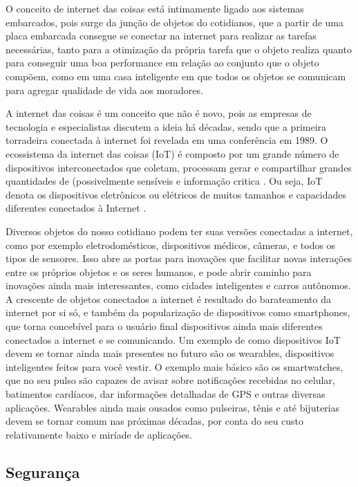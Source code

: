 O conceito de internet das coisas está intimamente ligado aos sistemas embarcados, pois surge da junção de objetos do cotidianos, que a partir de uma placa embarcada consegue se conectar na internet \cite{iotDef} para realizar as tarefas necessárias, tanto para a otimização da própria tarefa que o objeto realiza quanto para conseguir uma boa performance em relação ao conjunto que o objeto compõem, como em uma casa inteligente em que todos os objetos se comunicam para agregar qualidade de vida aos moradores.

A internet das coisas é um conceito que não é novo, pois as empresas de tecnologia e especialistas discutem a ideia há décadas, sendo que a primeira torradeira conectada à internet foi revelada em uma conferência em 1989.
O ecossistema da internet das coisas (IoT) é composto por um
grande número de dispositivos interconectados que coletam, processam
gerar e compartilhar grandes quantidades de (possivelmente sensíveis e
informação critica \cite{brotsis2019blockchain}. Ou seja, IoT denota os dispositivos eletrônicos ou elétricos de muitos tamanhos e capacidades diferentes conectados à Internet \cite{miraz2018blockchain}.

Diversos objetos do nosso cotidiano podem ter suas versões conectadas a internet, como por exemplo eletrodomésticos, dispositivos médicos, câmeras, e todos os tipos de sensores. Isso abre as portas para inovações que facilitar novas interações entre os próprios objetos e os seres humanos, e pode abrir caminho para inovações ainda mais interessantes, como cidades inteligentes e carros autônomos. A crescente de objetos conectados a internet é resultado do barateamento da internet por si só, e também da popularização de dispositivos como smartphones, que torna concebível para o usuário final dispositivos ainda mais diferentes conectados a internet e se comunicando.
Um exemplo de como dispositivos IoT devem se tornar ainda mais presentes no futuro são os wearables, dispositivos inteligentes feitos para você vestir. O exemplo mais básico são os smartwatches, que no seu pulso são capazes de avisar sobre notificações recebidas no celular, batimentos cardíacos, dar informações detalhadas de GPS e outras diversas aplicações. Wearables ainda mais ousados como pulseiras, tênis e até bijuterias devem se tornar comum nas próximas décadas, por conta do seu custo relativamente baixo e miríade de aplicações.

\subsection{Segurança}


